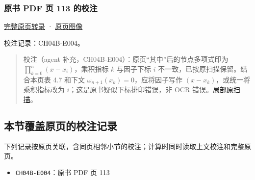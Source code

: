 \documentclass[
  10pt,
  fontset=fandol]{ctexart}
\providecommand{\tightlist}{%
  \setlength{\itemsep}{0pt}\setlength{\parskip}{0pt}}
\begin{document}
\subsubsection{原书 PDF 页 113 的校注}\label{ux539fux4e66-pdf-ux9875-113-ux7684ux6821ux6ce8}

\href{../pages/pdf-113.md}{完整原页转录} · \href{../../source-images/pdf-113.jpeg}{原页图像}

校注记录：CH04B-E004。

\begin{quote}
校注（agent 补充，CH04B-E004）：原页``其中''后的节点多项式印为 \(\prod_{k=0}^{n}(x-x_i)\)，乘积指标 \(k\) 与因子下标 \(i\) 不一致，已按原扫描保留。结合本页表 4.7 和下文 \(\omega_{n+1}(x_k)=0\)，应将因子写作 \((x-x_k)\)，或统一将乘积指标改为 \(i\)；这是原书疑似下标排印错误，非 OCR 错误。\href{../assets/ch04b/review-p113-product.png}{局部原扫描}。
\end{quote}

\subsection{本节覆盖原页的校注记录}\label{ux672cux8282ux8986ux76d6ux539fux9875ux7684ux6821ux6ce8ux8bb0ux5f55}

下列记录按原页关联，含同页相邻小节的校注；计算时同时读取上文校注和完整原页。

\begin{itemize}
\tightlist
\item
  \texttt{CH04B-E004}：原书 PDF 页 113
\end{itemize}
\end{document}
